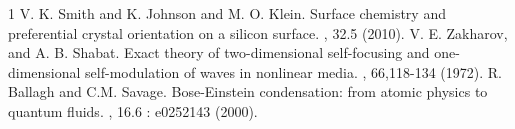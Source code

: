 \documentclass{ffds}                %
\begin{document}
 
\begin{footnotesize}
\begin{thebibliography}{1}
V. K. Smith and K. Johnson and M. O. Klein.
Surface chemistry and preferential crystal orientation on a silicon surface.
, 32.5 (2010).
V. E. Zakharov, and A. B. Shabat.
Exact theory of two-dimensional self-focusing and one-dimensional self-modulation of waves in nonlinear media.
, 66,118-134 (1972).
R. Ballagh and C.M. Savage.
Bose-Einstein condensation: from atomic physics to quantum fluids.
, 16.6 : e0252143 (2000).
\end{thebibliography}
\end{footnotesize}
\end{document}
